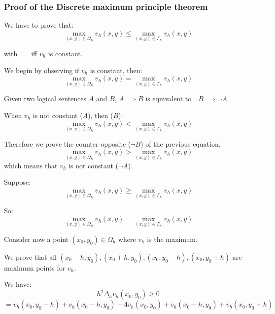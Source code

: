\subsubsection{Proof of the Discrete maximum principle theorem}

We have to prove that:
\begin{equation*}
\max_{(x,y) \in \Omega_h} v_h(x, y) \le \max_{(x,y) \in \Gamma_h} v_h(x, y) 
\end{equation*}

with $=$ iff $v_h$ is constant.

We begin by observing if $v_h$ is constant, then:
\begin{equation*}
\max_{(x,y) \in \Omega_h} v_h(x, y) = \max_{(x,y) \in \Gamma_h} v_h(x, y) 
\end{equation*}

Given two logical sentences $A$ and $B$, $A \implies B$ is equivalent to $\neg B \implies \neg A$

When $v_h$ is not constant ($A$), then ($B$):
\begin{equation*}
\max_{(x,y) \in \Omega_h} v_h(x, y) < \max_{(x,y) \in \Gamma_h} v_h(x, y) 
\end{equation*}

Therefore we prove the counter-opposite ($\neg B$) of the previous equation.
\begin{equation*}
\max_{(x,y) \in \Omega_h} v_h(x, y) > \max_{(x,y) \in \Gamma_h} v_h(x, y) 
\end{equation*}
which means that $v_h$ is not constant ($\neg A$).

Suppose:
\begin{equation*}
\max_{(x,y) \in \Omega_h} v_h(x, y) \ge \max_{(x,y) \in \Gamma_h} v_h(x, y) 
\end{equation*}

So:
\begin{equation*}
\max_{(x,y) \in \Omega_h} v_h(x, y) = \max_{(x,y) \in \Gamma_h} v_h(x, y) 
\end{equation*}

Consider now a point $(x_0, y_0) \in \Omega_h$ where $v_h$ is the maximum.

We prove that all $(x_0 - h, y_0), (x_0 + h, y_0), (x_0, y_0 - h), (x_0, y_0 + h)$ are maximum points for $v_h$.

We have:
\begin{equation*}
h^2 \Delta_h v_h(x_0, y_0) \ge 0
\end{equation*}
\begin{equation*}
= v_h(x_0, y_0 - h) + v_h(x_0 - h, y_0) - 4 v_h(x_0, y_0) + v_h(x_0 + h, y_0) + v_h(x_0, y_0 + h)
\end{equation*}

